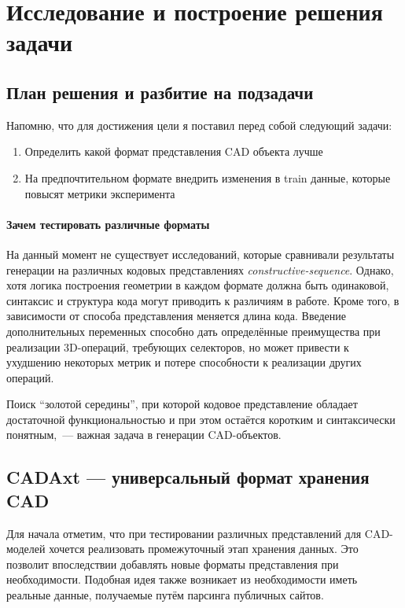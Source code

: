 \section{Исследование и построение решения задачи}
\label{sec:Chapter3} 

\subsection{План решения и разбитие на подзадачи}

Напомню, что для достижения цели я поставил перед собой следующий задачи:
\begin{enumerate}
    \item Определить какой формат представления CAD объекта лучше
    \item На предпочтительном формате внедрить изменения в train данные, которые повысят метрики эксперимента
\end{enumerate}

\paragraph{Зачем тестировать различные форматы}
На данный момент не существует исследований, которые сравнивали результаты генерации на различных кодовых представлениях \textit{constructive-sequence}.
Однако, хотя логика построения геометрии в каждом формате должна быть одинаковой, синтаксис и структура кода могут приводить к различиям в работе.
Кроме того, в зависимости от способа представления меняется длина кода.
Введение дополнительных переменных способно дать определённые преимущества при реализации 3D-операций, требующих селекторов,
но может привести к ухудшению некоторых метрик и потере способности к реализации других операций.

Поиск ``золотой середины'', при которой кодовое представление обладает достаточной функциональностью и при этом остаётся коротким и синтаксически понятным,~--- важная задача в генерации CAD-объектов.

\subsection{CADAxt --- универсальный формат хранения CAD}
Для начала отметим, что при тестировании различных представлений для CAD-моделей
хочется реализовать промежуточный этап хранения данных. Это позволит впоследствии
добавлять новые форматы представления при необходимости. Подобная идея также
возникает из необходимости иметь реальные данные, получаемые путём парсинга публичных сайтов.


